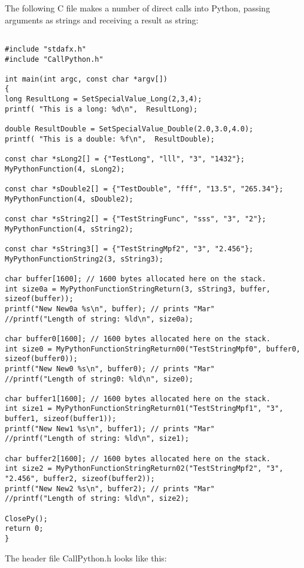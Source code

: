 \vpara
The following C file makes a number of direct calls into Python, passing arguments as strings and receiving a result as string:

\begin{lstlisting}

#include "stdafx.h"
#include "CallPython.h"

int main(int argc, const char *argv[])
{
long ResultLong = SetSpecialValue_Long(2,3,4);
printf( "This is a long: %d\n",  ResultLong);

double ResultDouble = SetSpecialValue_Double(2.0,3.0,4.0);
printf( "This is a double: %f\n",  ResultDouble);

const char *sLong2[] = {"TestLong", "lll", "3", "1432"};
MyPythonFunction(4, sLong2);

const char *sDouble2[] = {"TestDouble", "fff", "13.5", "265.34"};
MyPythonFunction(4, sDouble2);

const char *sString2[] = {"TestStringFunc", "sss", "3", "2"};
MyPythonFunction(4, sString2);

const char *sString3[] = {"TestStringMpf2", "3", "2.456"};
MyPythonFunctionString2(3, sString3);

char buffer[1600]; // 1600 bytes allocated here on the stack.
int size0a = MyPythonFunctionStringReturn(3, sString3, buffer, sizeof(buffer));
printf("New New0a %s\n", buffer); // prints "Mar"
//printf("Length of string: %ld\n", size0a);

char buffer0[1600]; // 1600 bytes allocated here on the stack.
int size0 = MyPythonFunctionStringReturn00("TestStringMpf0", buffer0, sizeof(buffer0));
printf("New New0 %s\n", buffer0); // prints "Mar"
//printf("Length of string0: %ld\n", size0);

char buffer1[1600]; // 1600 bytes allocated here on the stack.
int size1 = MyPythonFunctionStringReturn01("TestStringMpf1", "3", buffer1, sizeof(buffer1));
printf("New New1 %s\n", buffer1); // prints "Mar"
//printf("Length of string: %ld\n", size1);

char buffer2[1600]; // 1600 bytes allocated here on the stack.
int size2 = MyPythonFunctionStringReturn02("TestStringMpf2", "3", "2.456", buffer2, sizeof(buffer2));
printf("New New2 %s\n", buffer2); // prints "Mar"
//printf("Length of string: %ld\n", size2);

ClosePy();
return 0;
}

\end{lstlisting}

The header file CallPython.h looks like this:

